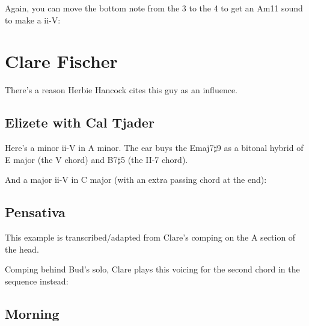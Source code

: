 Again, you can move the bottom note from the 3 to the 4 to get an Am11 sound to make a ii-V:


\section{Clare Fischer}

There's a reason Herbie Hancock cites this guy as an influence.

\subsection{Elizete with Cal Tjader}

Here's a minor ii-V in A minor.  The ear buys the Emaj7$\sharp$9 as a bitonal hybrid of E major (the V chord) and B7$\sharp$5 (the II-7 chord).


And a major ii-V in C major (with an extra passing chord at the end):


\subsection{Pensativa}

This example is transcribed/adapted from Clare's comping on the A section of the head.


Comping behind Bud's solo, Clare plays this voicing for the second chord in the sequence instead:

\subsection{Morning}

